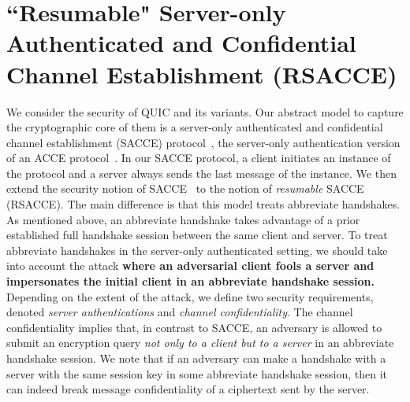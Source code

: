 \section{``Resumable" Server-only Authenticated and Confidential Channel Establishment (RSACCE)} \label{sec:rsacce}
We consider the security of QUIC and its variants.
Our abstract model to capture the cryptographic core
of them is a server-only authenticated and confidential
channel establishment (SACCE) protocol~\cite{KPW13:SACCE},
the server-only authentication version of an ACCE
protocol~\cite{JKSS12:ACCE}.
In our SACCE protocol, a client initiates an instance
of the protocol and a server always sends the last
message of the instance.
We then extend the security notion of
SACCE~\cite{KPW13:SACCE} to the notion of
\textit{resumable} SACCE (RSACCE).
The main difference is that this model treats
abbreviate handshakes.
As mentioned above, an abbreviate handshake takes
advantage of a prior established full handshake session
between the same client and server.
To treat abbreviate handshakes in the server-only
authenticated setting, we should take into account the
attack
\textbf{where an adversarial client fools a
server and impersonates the initial client in an
abbreviate handshake session.}
Depending on the extent of the attack, we define two
security requirements, denoted
\textit{server authentications} and
\textit{channel confidentiality}.
The channel confidentiality implies that, in contrast
to SACCE, an adversary is allowed to submit an
encryption query
\textit{not only to a client but to a server} in an
abbreviate handshake session.
We note that if an adversary can make a handshake with
a server with the same session key in some abbreviate
handshake session, then it can indeed break message
confidentiality of a ciphertext sent by the server.


